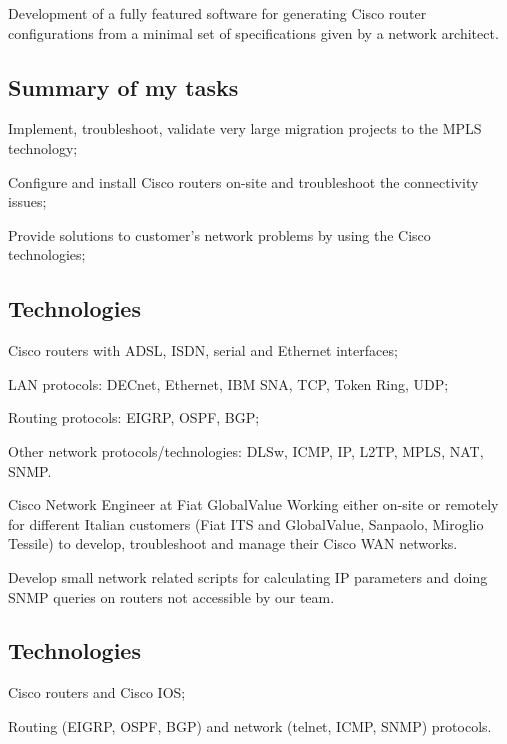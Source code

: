 Development of a fully featured software for generating Cisco router
configurations from a minimal set of specifications given by a network architect.

\subsection{Summary of my tasks}

\item{\bdot} Implement, troubleshoot, validate very large migration projects
   to the MPLS technology;
\item{\bdot} Configure and install Cisco routers on-site and troubleshoot the
   connectivity issues;
\item{\bdot} Provide solutions to customer's network problems by using the Cisco
   technologies;

\subsection{Technologies}

\item{\bdot} Cisco routers with ADSL, ISDN, serial and Ethernet interfaces;
\item{\bdot} LAN protocols: DECnet, Ethernet, IBM SNA, TCP, Token Ring, UDP;
\item{\bdot} Routing protocols: EIGRP, OSPF, BGP;
\item{\bdot} Other network protocols/technologies: DLSw, ICMP, IP, L2TP, 
   MPLS, NAT, SNMP.


\bigskip
{}
   {Cisco Network Engineer at Fiat GlobalValue}
Working either on-site or remotely for different Italian customers (Fiat ITS
and GlobalValue, Sanpaolo, Miroglio Tessile) to develop, troubleshoot and
manage their Cisco WAN networks.

Develop small network related scripts for calculating IP parameters and doing
SNMP queries on routers not accessible by our team.

\subsection{Technologies}

\item{\bdot} Cisco routers and Cisco IOS;
\item{\bdot} Routing (EIGRP, OSPF, BGP) and network (telnet, ICMP, SNMP)
             protocols.
   
